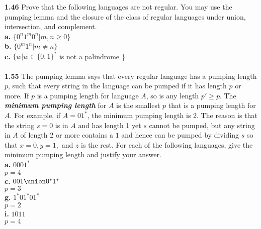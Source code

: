 \documentclass{article}
\begin{document}
{\bf1.46} Prove that the following languages are not regular. You may use the pumping lemma and the closure of the class of regular languages under union, intersection, and complement.\\
{\bf a.} $\{0^{n}1^{m}0^{n} | m,n \geq 0\}$\\
{\bf b.} $\{0^{m}1^{n} | m \neq n\}$\\
{\bf c.} $\{w | w \in \{0,1\}^{*} $ is not a palindrome \} \\
\\
{\bf 1.55} The pumping lemma says that every regular language has a pumping length $p$, such that every string in the language can be pumped if it has length $p$ or more. If $p$ is a pumping length for language $A$, so is any length $p' \geq p$. The {\bf {\em minimum pumping length}} for $A$ is the smallest $p$ that is a pumping length for $A$. For example, if $A = 01^{*}$, the minimum pumping length is 2. The reason is that the string $s=0$ is in $A$ and has length 1 yet $s$ cannot be pumped, but any string in $A$ of length 2 or more contains a $1$ and hence can be pumped by dividing $s$ so that $x=0, y = 1,$ and $z$ is the rest. For each of the following languages, give the minimum pumping length and justify your answer.
\\{\bf a.} $0001^{*}$
\\$p=4$
\\{\bf c.} $001 \union 0^{*}1^{*}$
\\$p=3$
\\{\bf g.} $1^{*}01^{*}01^{*}$
\\$p=2$
\\{\bf i.} $1011$
\\$p=4$
\end{document}
